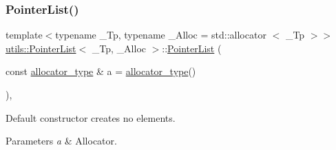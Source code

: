 \subsubsection{\texorpdfstring{Pointer\+List()}{PointerList()}\hspace{0.1cm}{\footnotesize\ttfamily [1/4]}}
{\footnotesize\ttfamily template$<$typename \+\_\+\+Tp, typename \+\_\+\+Alloc = std\+::allocator $<$ \+\_\+\+Tp $>$$>$ \\
\hyperlink{classutils_1_1PointerList}{utils\+::\+Pointer\+List}$<$ \+\_\+\+Tp, \+\_\+\+Alloc $>$\+::\hyperlink{classutils_1_1PointerList}{Pointer\+List} (\begin{DoxyParamCaption}\item[{const \hyperlink{classutils_1_1PointerList_a3b41bb503c3d41a7120b1a9cd1ba9848}{allocator\+\_\+type} \&}]{a = {\ttfamily \hyperlink{classutils_1_1PointerList_a3b41bb503c3d41a7120b1a9cd1ba9848}{allocator\+\_\+type}()} }\end{DoxyParamCaption})\hspace{0.3cm}{\ttfamily [inline]}, {\ttfamily [explicit]}}



Default constructor creates no elements. 


\begin{DoxyParams}{Parameters}
{\em a} & Allocator. \\
\hline
\end{DoxyParams}
\mbox{\label{classutils_1_1PointerList_afc8d53379d6f553abb47460eb589f67c}} 
